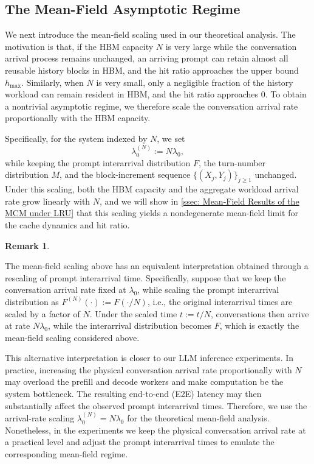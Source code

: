 \documentclass{article}
\theoremstyle{definition}
\newtheorem{remark}[remark]{Remark}
\begin{document}
\subsection{The Mean-Field Asymptotic Regime}
\label{ssec: Our Mean-Field Model}


We next introduce the mean-field scaling used in our theoretical analysis. The motivation is that, if the HBM capacity $N$ is very large while the conversation arrival process remains unchanged, an arriving prompt can retain almost all reusable history blocks in HBM, and the hit ratio approaches the upper bound $h_{\max}$. Similarly, when $N$ is very small, only a negligible fraction of the history workload can remain resident in HBM, and the hit ratio approaches $0$. To obtain a nontrivial asymptotic regime, we therefore scale the conversation arrival rate proportionally with the HBM capacity.

Specifically, for the system indexed by $N$, we set
\begin{equation*}
    \lambda_0^{(N)}:=N\lambda_0,
\end{equation*}
while keeping the prompt interarrival distribution $F$, the turn-number distribution $M$, and the block-increment sequence $\{(X_j,Y_j)\}_{j\geq1}$ unchanged. Under this scaling, both the HBM capacity and the aggregate workload arrival rate grow linearly with $N$, and we will show in \cref{ssec: Mean-Field Results of the MCM under LRU} that this scaling yields a nondegenerate mean-field limit for the cache dynamics and hit ratio.


\begin{remark}
    \label{rmk: different scaling way}

    The mean-field scaling above has an equivalent interpretation obtained through a rescaling of prompt interarrival time. Specifically, suppose that we keep the conversation arrival rate fixed at $\lambda_0$, while scaling the prompt interarrival distribution as $F^{(N)}(\cdot):=F(\cdot/N)$, i.e., the original interarrival times are scaled by a factor of $N$. Under the scaled time $t:=t/N$, conversations then arrive at rate $N\lambda_0$, while the interarrival distribution becomes $F$, which is exactly the mean-field scaling considered above.

    This alternative interpretation is closer to our LLM inference experiments. In practice, increasing the physical conversation arrival rate proportionally with $N$ may overload the prefill and decode workers and make computation be the system bottleneck. The resulting end-to-end (E2E) latency may then substantially affect the observed prompt interarrival times. Therefore, we use the arrival-rate scaling $\lambda_0^{(N)}=N\lambda_0$ for the theoretical mean-field analysis. Nonetheless, in the experiments we keep the physical conversation arrival rate at a practical level and adjust the prompt interarrival times to emulate the corresponding mean-field regime.
\end{remark}
\end{document}
